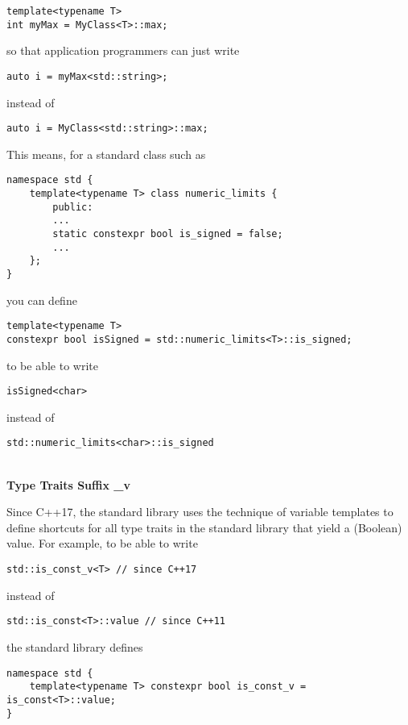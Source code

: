 \begin{lstlisting}[style=styleCXX]
template<typename T>
int myMax = MyClass<T>::max;
\end{lstlisting}

so that application programmers can just write

\begin{lstlisting}[style=styleCXX]
auto i = myMax<std::string>;
\end{lstlisting}

instead of

\begin{lstlisting}[style=styleCXX]
auto i = MyClass<std::string>::max;
\end{lstlisting}

This means, for a standard class such as

\begin{lstlisting}[style=styleCXX]
namespace std {
	template<typename T> class numeric_limits {
		public:
		...
		static constexpr bool is_signed = false;
		...
	};
}
\end{lstlisting}

you can define

\begin{lstlisting}[style=styleCXX]
template<typename T>
constexpr bool isSigned = std::numeric_limits<T>::is_signed;
\end{lstlisting}

to be able to write

\begin{lstlisting}[style=styleCXX]
isSigned<char>
\end{lstlisting}

instead of

\begin{lstlisting}[style=styleCXX]
std::numeric_limits<char>::is_signed
\end{lstlisting}

\hspace*{\fill} \\ %
\noindent
\textbf{Type Traits Suffix \_v}

Since C++17, the standard library uses the technique of variable templates to define shortcuts for all type traits in the standard library that yield a (Boolean) value. For example, to be able to write

\begin{lstlisting}[style=styleCXX]
std::is_const_v<T> // since C++17
\end{lstlisting}

instead of

\begin{lstlisting}[style=styleCXX]
std::is_const<T>::value // since C++11
\end{lstlisting}

the standard library defines

\begin{lstlisting}[style=styleCXX]
namespace std {
	template<typename T> constexpr bool is_const_v = is_const<T>::value;
}
\end{lstlisting}






















